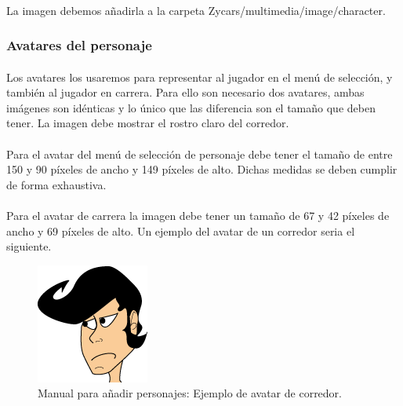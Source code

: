 \paragraph{}
La imagen debemos añadirla a la carpeta Zycars/multimedia/image/character.

\subsubsection{Avatares del personaje}

\paragraph{}
Los avatares los usaremos para representar al jugador en el menú de selección, y también al jugador en carrera. Para ello son 
necesario dos avatares, ambas imágenes son idénticas y lo único que las diferencia son el tamaño que deben tener. La imagen debe
mostrar el rostro claro del corredor.

\paragraph{}
Para el avatar del menú de selección de personaje debe tener el tamaño de entre 150 y 90 píxeles de ancho y 149 píxeles de alto. 
Dichas medidas se deben cumplir de forma exhaustiva.

\paragraph{}
Para el avatar de carrera la imagen debe tener un tamaño de 67 y 42 píxeles de ancho y 69 píxeles de alto. Un ejemplo del avatar de 
un corredor seria el siguiente.

\begin{figure}[H]
  \label{ejemplo_avatar}
  \begin{center}
    \includegraphics[scale=0.7]{imagenes/ejemplo_avatar.png}
  \end{center}
  \caption{Manual para añadir personajes: Ejemplo de avatar de corredor.}
\end{figure}

